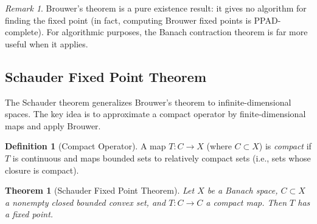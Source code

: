 \documentclass[11pt,a4paper]{article}
\theoremstyle{definition}
\newtheorem{definition}{Definition}[section]
\theoremstyle{plain}
\newtheorem{theorem}{Theorem}[section]
\theoremstyle{remark}
\newtheorem{remark}{Remark}[section]
\begin{document}
\begin{remark}\label{rem:brouwer-nonconstructive}
Brouwer's theorem is a pure existence result: it gives no algorithm for
finding the fixed point (in fact, computing Brouwer fixed points is
PPAD-complete). For algorithmic purposes, the Banach contraction theorem
is far more useful when it applies.
\end{remark}

\subsection{Schauder Fixed Point Theorem}

The Schauder theorem generalizes Brouwer's theorem to infinite-dimensional
spaces. The key idea is to approximate a compact operator by finite-dimensional
maps and apply Brouwer.

\begin{definition}[Compact Operator]\label{def:compact-op}
A map $T \colon C \to X$ (where $C \subset X$) is \emph{compact} if $T$ is
continuous and maps bounded sets to relatively compact sets (i.e., sets whose
closure is compact).
\end{definition}

\begin{theorem}[Schauder Fixed Point Theorem]\label{thm:schauder}
Let $X$ be a Banach space, $C \subset X$ a nonempty closed bounded convex set,
and $T \colon C \to C$ a compact map. Then $T$ has a fixed point.
\end{theorem}
\end{document}
